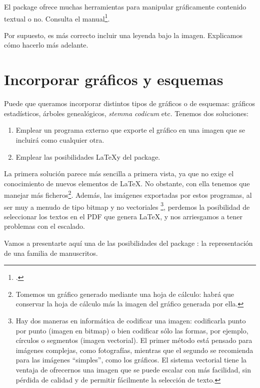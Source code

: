 \begin{plusloins}
El package  ofrece muchas herramientas para manipular gráficamente contenido textual o no. Consulta el manual\footcite{graphicx}.
\end{plusloins}

\begin{attention}
Por supuesto, es más correcto incluir una leyenda bajo la imagen. Explicamos cómo hacerlo más adelante.
\end{attention}

\section{Incorporar gráficos y esquemas}

Puede que queramos incorporar distintos tipos de gráficos o de esquemas: gráficos estadísticos, árboles genealógicos, \emph{stemma codicum} etc.
Tenemos dos soluciones:
\begin{enumerate}
\item Emplear un programa externo que exporte el gráfico en una imagen que se incluirá como cualquier otra.
\item Emplear las posibilidades \LaTeX y del package.\label{TikZ}
\end{enumerate}

La primera solución parece más sencilla a primera vista, ya que no exige el conocimiento de nuevos elementos de \LaTeX. No obstante, con ella tenemos que manejar más ficheros\footnote{Tomemos un gráfico generado mediante una hoja de cálculo: habrá que conservar la hoja de cálculo más la imagen del gráfico generada por ella.}. Además, las imágenes exportadas por estos programas, al ser muy a menudo de tipo bitmap y no vectoriales%
\footnote{Hay dos maneras en informática de codificar una imagen: codificarla punto por punto (imagen en bitmap) o bien codificar sólo las formas, por ejemplo, círculos o segmentos (imagen vectorial). El primer método está pensado para imágenes complejas, como fotografías, mientras que el segundo se recomienda para las imágenes \enquote{simples}, como los gráficos. El sistema vectorial tiene la ventaja de ofrecernos una imagen que se puede escalar con más facilidad, sin pérdida de calidad y de permitir fácilmente la selección de texto.}, perdemos la posibilidad de seleccionar los textos en el PDF que genera \LaTeX, y nos arriesgamos a tener problemas con el escalado.

Vamos a presentarte aquí una de las posibilidades del package : la representación de una familia de manuscritos. 

